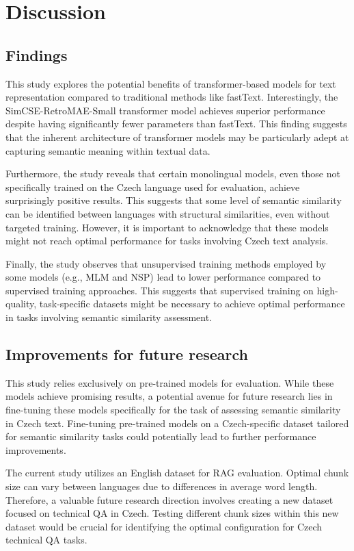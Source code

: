 
\chapter{Discussion\label{chap:discussion}}

\section{Findings}
This study explores the potential benefits of transformer-based models for text representation compared to traditional methods like fastText.
Interestingly, the SimCSE-RetroMAE-Small transformer model achieves superior performance despite having significantly fewer parameters than fastText.
This finding suggests that the inherent architecture of transformer models may be particularly adept at capturing semantic meaning within textual data.

Furthermore, the study reveals that certain monolingual models, even those not specifically trained on the Czech language used for evaluation, achieve surprisingly positive results.
This suggests that some level of semantic similarity can be identified between languages with structural similarities, even without targeted training.
However, it is important to acknowledge that these models might not reach optimal performance for tasks involving Czech text analysis.

Finally, the study observes that unsupervised training methods employed by some models (e.g., MLM and NSP) lead to lower performance compared to supervised training approaches.
This suggests that supervised training on high-quality, task-specific datasets might be necessary to achieve optimal performance in tasks involving semantic similarity assessment.

\section{Improvements for future research}
This study relies exclusively on pre-trained models for evaluation.
While these models achieve promising results, a potential avenue for future research lies in fine-tuning these models specifically for the task of assessing semantic similarity in Czech text.
Fine-tuning pre-trained models on a Czech-specific dataset tailored for semantic similarity tasks could potentially lead to further performance improvements.

The current study utilizes an English dataset for \ac{RAG} evaluation.
Optimal chunk size can vary between languages due to differences in average word length.
Therefore, a valuable future research direction involves creating a new dataset focused on technical \ac{QA} in Czech.
Testing different chunk sizes within this new dataset would be crucial for identifying the optimal configuration for Czech technical \ac{QA} tasks.

